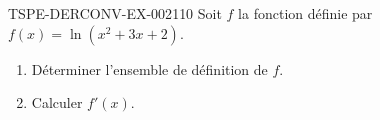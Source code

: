 \begin{exercice}{TSPE-DERCONV-EX-002}{1}{10}
Soit $f$ la fonction définie par $f(x) = \ln(x^2 + 3x + 2)$.
\begin{enumerate}
  \item Déterminer l'ensemble de définition de $f$.
  \item Calculer $f'(x)$.
\end{enumerate}

\end{exercice}
